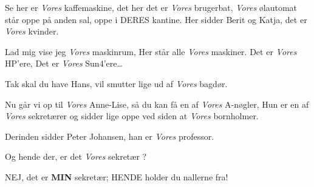 \documentclass{article}
\begin{document}
\begin{sketch}
 Se her er {\em Vores} kaffemaskine, det her det er {\em Vores}
brugerbat, {\em Vores} ølautomat står oppe på anden sal, oppe i DERES
kantine. Her sidder Berit og Katja, det er {\em Vores} kvinder.

Lad mig vise jeg {\em Vores} maskinrum, Her står alle {\em Vores} maskiner.
Det er {\em Vores} HP'ere, Det er {\em Vores} Sun4'ere\ldots

 Tak skal du have Hans, vil smutter lige ud af {\em Vores} bagdør.

 Nu går vi op til {\em Vores} Anne-Lise, så du kan få en af {\em
  Vores} A-nøgler, Hun er en af {\em Vores} sekretærer og sidder lige oppe
ved siden at {\em Vores} bornholmer.

 Derinden sidder Peter Johansen, han er {\em Vores} professor.

 Og hende der, er det {\em Vores} sekretær ?

 NEJ, det er {\bf MIN} sekretær; HENDE holder du nallerne fra!

\end{sketch}
\end{document}
